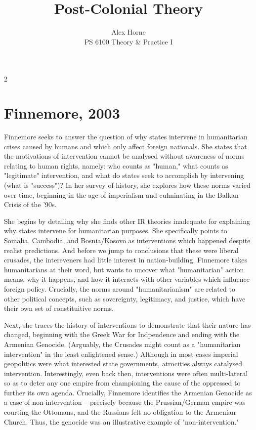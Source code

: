 \documentclass[letterpaper,12pt,twoside]{article}
\title{\textbf{Post-Colonial Theory}}
\author{Alex Horne \\ PS 6100 Theory \& Practice I}
\date{}
\begin{document}
\maketitle

\begin {multicols}{2}
\section*{Finnemore, 2003}

Finnemore seeks to answer the question of why states intervene in humanitarian crises caused by humans and which only affect foreign nationals. She states that the motivations of intervention cannot be analysed without awareness of norms relating to human rights, namely: who counts as "human," what counts as "legitimate" intervention, and what do states seek to accomplish by intervening (what is "success")? In her survey of history, she explores how these norms varied over time, beginning in the age of imperialism and culminating in the Balkan Crisis of the '90s.

She begins by detailing why she finds other IR theories inadequate for explaining why states intervene for humanitarian purposes. She specifically points to Somalia, Cambodia, and Bosnia/Kosovo as interventions which happened despite realist predictions. And before we jump to conclusions that these were liberal crusades, the intereveners had little interest in nation-building. Finnemore takes humanitarians at their word, but wants to uncover what "humanitarian" action means, why it happens, and how it interacts with other variables which influence foreign policy. Crucially, the norms around "humanitarianism" are related to other political concepts, such as sovereignty, legitimacy, and justice, which have their own set of constituitive norms.

Next, she traces the history of interventions to demonstrate that their nature has changed, beginning with the Greek War for Indpendence and ending with the Armenian Genocide. (Arguably, the Crusades might count as a "humanitarian intervention" in the least enlightened sense.) Although in most cases imperial geopolitics were what interested state governments, atrocities always catalysed intervention. Interestingly, even back then, interventions were often multi-lateral so as to deter any one empire from championing the cause of the oppressed to further its own agenda. Crucially, Finnemore identifies the Armenian Genocide as a case of non-intervention – precisely because the Prussian/German empire was courting the Ottomans, and the Russians felt no obligation to the Armenian Church. Thus, the genocide was an illustrative example of "non-intervention."


\end{multicols}
\end{document}
